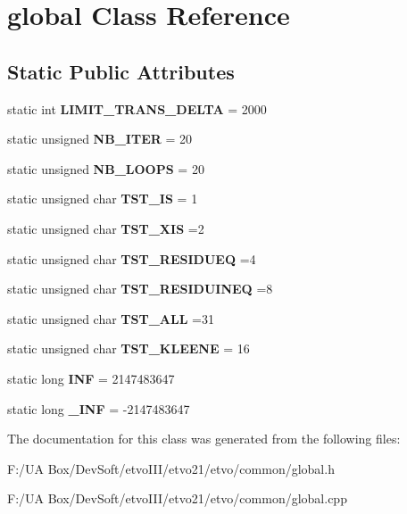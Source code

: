 \section{global Class Reference}
\label{classglobal}
\subsection*{Static Public Attributes}
\begin{DoxyCompactItemize}
\item 
\mbox{\label{classglobal_a9fe6aeb44df54c3e343f6239074246b3}} 
static int {\bfseries L\+I\+M\+I\+T\+\_\+\+T\+R\+A\+N\+S\+\_\+\+D\+E\+L\+TA} = 2000
\item 
\mbox{\label{classglobal_acc4aeb51e1ad5462dab6fce5ed4ce10f}} 
static unsigned {\bfseries N\+B\+\_\+\+I\+T\+ER} = 20
\item 
\mbox{\label{classglobal_a8153f51df56fd7b014bd0bb6474d2d92}} 
static unsigned {\bfseries N\+B\+\_\+\+L\+O\+O\+PS} = 20
\item 
\mbox{\label{classglobal_a745de8daa78fcc2e02d355bcacdb2047}} 
static unsigned char {\bfseries T\+S\+T\+\_\+\+IS} = 1
\item 
\mbox{\label{classglobal_afdd98731166b06015b81324312a983f6}} 
static unsigned char {\bfseries T\+S\+T\+\_\+\+X\+IS} =2
\item 
\mbox{\label{classglobal_a7aea29eb941a586207d32e4c74c5dbc9}} 
static unsigned char {\bfseries T\+S\+T\+\_\+\+R\+E\+S\+I\+D\+U\+EQ} =4
\item 
\mbox{\label{classglobal_aa6d8b94869d802c205cde70e93f34147}} 
static unsigned char {\bfseries T\+S\+T\+\_\+\+R\+E\+S\+I\+D\+U\+I\+N\+EQ} =8
\item 
\mbox{\label{classglobal_a08bdf876f09fa139ae1ce8e6b8225734}} 
static unsigned char {\bfseries T\+S\+T\+\_\+\+A\+LL} =31
\item 
\mbox{\label{classglobal_a5ece81970bfcede24f93054fe77419c4}} 
static unsigned char {\bfseries T\+S\+T\+\_\+\+K\+L\+E\+E\+NE} = 16
\item 
\mbox{\label{classglobal_a0a9a0abc84481a0cb0ddef8f9288ea69}} 
static long {\bfseries I\+NF} = 2147483647
\item 
\mbox{\label{classglobal_a860fb67122fac26af5eb53e82ea07983}} 
static long {\bfseries \+\_\+\+I\+NF} = -\/2147483647
\end{DoxyCompactItemize}


The documentation for this class was generated from the following files\+:\begin{DoxyCompactItemize}
\item 
F\+:/\+U\+A Box/\+Dev\+Soft/etvo\+I\+I\+I/etvo21/etvo/common/global.\+h\item 
F\+:/\+U\+A Box/\+Dev\+Soft/etvo\+I\+I\+I/etvo21/etvo/common/global.\+cpp\end{DoxyCompactItemize}
